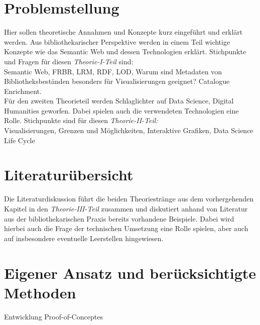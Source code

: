 \documentclass[10pt,a4paper,twocolumn,conference]{IEEEtran}
\begin{document}
\section{Problemstellung}
Hier sollen theoretische Annahmen und Konzepte kurz eingeführt und erklärt
werden. Aus bibliothekarischer Perspektive werden in einem Teil wichtige
Konzepte wie das Semantic Web und dessen Technologien erklärt. Stichpunkte und
Fragen für diesen \textit{Theorie-I-Teil} sind:\\
Semantic Web, FRBR, LRM, RDF, LOD, Warum sind Metadaten von
Bibliotheksbeständen besonders für Visualisierungen geeignet? Catalogue
Enrichment.\cite{RN8}\\ Für den zweiten Theorieteil werden Schlaglichter auf Data
Science, Digital Humanities geworfen. Dabei spielen auch die verwendeten
Technologien eine Rolle. Stichpunkte sind für diesen \textit{Theorie-II-Teil:}\\
Visualisierungen, Grenzen und Möglichkeiten, Interaktive Grafiken,
Data Science Life Cycle

\section{Literaturübersicht}
Die Literaturdiskussion führt die beiden Theoriestränge aus dem vorhergehenden
Kapitel in den \textit{Theorie-III-Teil} zusammen und diskutiert anhand 
von Literatur aus der bibliothekarischen Praxis bereits vorhandene Beispiele. 
Dabei wird hierbei auch die Frage der technischen Umsetzung eine Rolle spielen,
aber auch auf insbesondere eventuelle Leerstellen hingewiesen.

\section{Eigener Ansatz und berücksichtigte Methoden}
Entwicklung Proof-of-Conceptes
\end{document}
